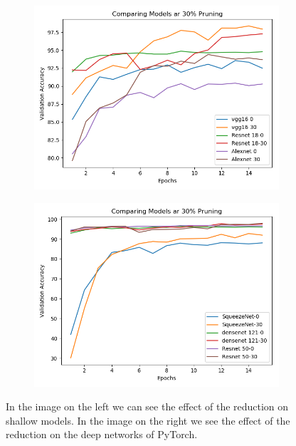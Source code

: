 \documentclass[12pt]{article}
\begin{document}
\begin{figure}[H]
	\centering
	\begin{subfigure}[b]{0.5\textwidth}            
		\includegraphics[width=\textwidth]{various_models_shallow}
		\label{fig:SRl}
	\end{subfigure}%
	\begin{subfigure}[b]{0.5\textwidth}
		\centering
		\includegraphics[width=\textwidth]{various_models_deep}
		\label{fig:D-Imager}
	\end{subfigure}
	\caption{In the image on the left we can see the effect of the reduction on shallow models. In the image on the right we see the effect of the reduction on the deep networks of PyTorch.}
\end{figure}
\end{document}
